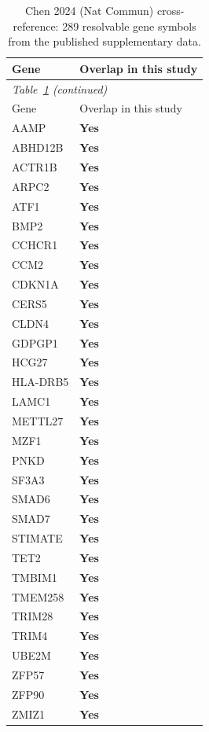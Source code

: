 \begin{longtable}{ll}
\caption{Chen 2024 (Nat Commun) cross-reference: 289 resolvable gene symbols from the published supplementary data.}\label{tab:chen2024_overlap}\\
\toprule
  Gene & Overlap in this study \\
\midrule
\endfirsthead
\multicolumn{2}{l}{\textit{Table~\ref{tab:chen2024_overlap} (continued)}} \\
\toprule
  Gene & Overlap in this study \\
\midrule
\endhead
\bottomrule
\endfoot
  AAMP & \textbf{Yes} \\
  ABHD12B & \textbf{Yes} \\
  ACTR1B & \textbf{Yes} \\
  ARPC2 & \textbf{Yes} \\
  ATF1 & \textbf{Yes} \\
  BMP2 & \textbf{Yes} \\
  CCHCR1 & \textbf{Yes} \\
  CCM2 & \textbf{Yes} \\
  CDKN1A & \textbf{Yes} \\
  CERS5 & \textbf{Yes} \\
  CLDN4 & \textbf{Yes} \\
  GDPGP1 & \textbf{Yes} \\
  HCG27 & \textbf{Yes} \\
  HLA-DRB5 & \textbf{Yes} \\
  LAMC1 & \textbf{Yes} \\
  METTL27 & \textbf{Yes} \\
  MZF1 & \textbf{Yes} \\
  PNKD & \textbf{Yes} \\
  SF3A3 & \textbf{Yes} \\
  SMAD6 & \textbf{Yes} \\
  SMAD7 & \textbf{Yes} \\
  STIMATE & \textbf{Yes} \\
  TET2 & \textbf{Yes} \\
  TMBIM1 & \textbf{Yes} \\
  TMEM258 & \textbf{Yes} \\
  TRIM28 & \textbf{Yes} \\
  TRIM4 & \textbf{Yes} \\
  UBE2M & \textbf{Yes} \\
  ZFP57 & \textbf{Yes} \\
  ZFP90 & \textbf{Yes} \\
  ZMIZ1 & \textbf{Yes} \\

\end{longtable}
